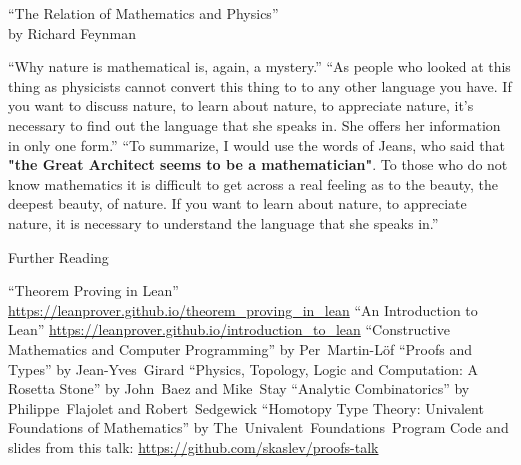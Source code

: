 \documentclass[pdf]{beamer}
\begin{document}
\begin{frame}{``The Relation of Mathematics and Physics''\footnotemark[6] \\ by Richard Feynman}
  \small
  \begin{outline}
    \1 ``Why nature is mathematical is, again, a mystery.''
    \1 ``As people who looked at this thing as physicists cannot convert this thing to to any other language you have. If you want to discuss nature, to learn about nature, to appreciate nature, it's necessary to find out the language that she speaks in. She offers her information in only one form.''
    \1 ``To summarize, I would use the words of Jeans, who said that \textbf{"the Great Architect seems to be a mathematician"}. To those who do not know mathematics it is difficult to get across a real feeling as to the beauty, the deepest beauty, of nature. If you want to learn about nature, to appreciate nature, it is necessary to understand the language that she speaks in.''
  \end{outline}
\end{frame}

\begin{frame}{Further Reading}
  \small
  \begin{outline}
    \1 ``Theorem Proving in Lean'' \url{https://leanprover.github.io/theorem_proving_in_lean}
    \1 ``An Introduction to Lean'' \url{https://leanprover.github.io/introduction_to_lean}
    \1 ``Constructive Mathematics and Computer Programming'' by \mbox{Per Martin-L\"{o}f}
    \1 ``Proofs and Types'' by \mbox{Jean-Yves Girard}
    \1 ``Physics, Topology, Logic and Computation: A Rosetta Stone'' by \mbox{John Baez} and \mbox{Mike Stay}
    \1 ``Analytic Combinatorics'' by \mbox{Philippe Flajolet} and \mbox{Robert Sedgewick}
    \1 ``Homotopy Type Theory: Univalent Foundations of Mathematics'' by \mbox{The Univalent Foundations Program}
    \1 Code and slides from this talk: \url{https://github.com/skaslev/proofs-talk}
  \end{outline}
\end{frame}
\end{document}
